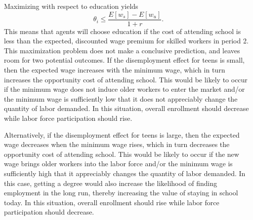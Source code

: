 \documentclass[12pt]{article}
\begin{document}
Maximizing with respect to education yields
\begin{equation}
\theta_i \le \frac{E[w_s] - E[w_u]}{1+r} .
\label{eq:threshold}
\end{equation}
This means that agents will choose education if the cost of attending school is less than the expected, discounted wage premium for skilled workers in period 2. This maximization problem does not make a conclusive prediction, and leaves room for two potential outcomes. If the disemployment effect for teens is small, then the expected wage increases with the minimum wage, which in turn increases the opportunity cost of attending school. This would be likely to occur if the minimum wage does not induce older workers to enter the market and/or the minimum wage is sufficiently low that it does not appreciably change the quantity of labor demanded. In this situation, overall enrollment should decrease while labor force participation should rise.

Alternatively, if the disemployment effect for teens is large, then the expected wage decreases when the minimum wage rises, which in turn decreases the opportunity cost of attending school. This would be likely to occur if the new wage brings older workers into the labor force and/or the minimum wage is sufficiently high that it appreciably changes the quantity of labor demanded. In this case, getting a degree would also increase the likelihood of finding employment in the long run, thereby increasing the value of staying in school today. In this situation, overall enrollment should rise while labor force participation should decrease.
\end{document}
